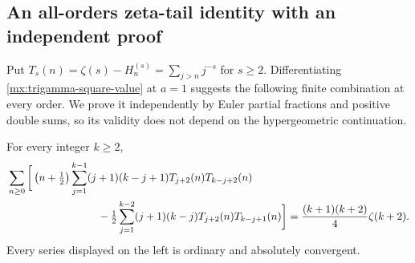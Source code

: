 \subsection{An all-orders zeta-tail identity with an independent proof}
Put $T_s(n)=\zeta(s)-H_n^{(s)}=\sum_{j>n}j^{-s}$ for $s\ge2$.
Differentiating \eqref{mx:trigamma-square-value} at $a=1$ suggests the
following finite combination at every order. We prove it independently
by Euler partial fractions and positive double sums, so its validity
does not depend on the hypergeometric continuation.
\begin{theorem}\label{mx:tail-family}
For every integer $k\ge2$,
\begin{align}
 &\sum_{n\ge0}\bigg[
 \left(n+\tfrac12\right)\sum_{j=1}^{k-1}(j+1)(k-j+1)
                 T_{j+2}(n)T_{k-j+2}(n)\notag\\
 &\hspace{30mm}-\tfrac12\sum_{j=1}^{k-2}(j+1)(k-j)
                 T_{j+2}(n)T_{k-j+1}(n)\bigg]
 =\frac{(k+1)(k+2)}4\zeta(k+2).
 \label{mx:tail-family-value}
\end{align}
Every series displayed on the left is ordinary and absolutely convergent.
\end{theorem}
